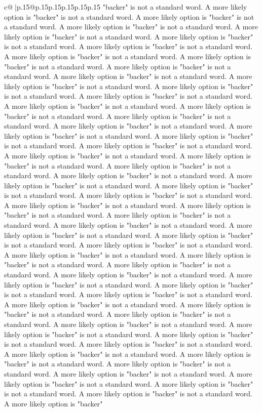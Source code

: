 \documentclass{article}
\begin{document}
{\begin{supertabular}{c@{$\;$}|p{.15\linewidth}@{}p{.15\linewidth}p{.15\linewidth}p{.15\linewidth}p{.15\linewidth}p{.15\linewidth}}
{{{"backer" is not a standard word. A more likely option is "backer" is not a standard word. A more likely option is "backer" is not a standard word. A more likely option is "backer" is not a standard word. A more likely option is "backer" is not a standard word. A more likely option is "backer" is not a standard word. A more likely option is "backer" is not a standard word. A more likely option is "backer" is not a standard word. A more likely option is "backer" is not a standard word. A more likely option is "backer" is not a standard word. A more likely option is "backer" is not a standard word. A more likely option is "backer" is not a standard word. A more likely option is "backer" is not a standard word. A more likely option is "backer" is not a standard word. A more likely option is "backer" is not a standard word. A more likely option is "backer" is not a standard word. A more likely option is "backer" is not a standard word. A more likely option is "backer" is not a standard word. A more likely option is "backer" is not a standard word. A more likely option is "backer" is not a standard word. A more likely option is "backer" is not a standard word. A more likely option is "backer" is not a standard word. A more likely option is "backer" is not a standard word. A more likely option is "backer" is not a standard word. A more likely option is "backer" is not a standard word. A more likely option is "backer" is not a standard word. A more likely option is "backer" is not a standard word. A more likely option is "backer" is not a standard word. A more likely option is "backer" is not a standard word. A more likely option is "backer" is not a standard word. A more likely option is "backer" is not a standard word. A more likely option is "backer" is not a standard word. A more likely option is "backer" is not a standard word. A more likely option is "backer" is not a standard word. A more likely option is "backer" is not a standard word. A more likely option is "backer" is not a standard word. A more likely option is "backer" is not a standard word. A more likely option is "backer" is not a standard word. A more likely option is "backer" is not a standard word. A more likely option is "backer" is not a standard word. A more likely option is "backer" is not a standard word. A more likely option is "backer" is not a standard word. A more likely option is "backer" is not a standard word. A more likely option is "backer" is not a standard word. A more likely option is "backer" is not a standard word. A more likely option is "backer" is not a standard word. A more likely option is "backer" is not a standard word. A more likely option is "backer" is not a standard word. A more likely option is "backer" is not a standard word. A more likely option is "backer" is not a standard word. A more likely option is "backer" is not a standard word. A more likely option is "backer" is not a standard word. A more likely option is "backer" is not a standard word. A more likely option is "backer" is not a standard word. A more likely option is "backer" is not a standard word. A more likely option is "backer" is not a standard word. A more likely option is "backer" }}}
\end{supertabular}}
\end{document}

